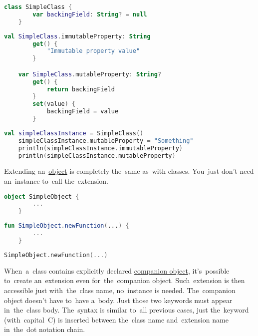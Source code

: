 \begin{lstlisting}[language=Kotlin, title={Class with a~backing field}]
    class SimpleClass {
        var backingField: String? = null
    }
\end{lstlisting}
\begin{lstlisting}[language=Kotlin, title={Extensions definition}]
    val SimpleClass.immutableProperty: String
        get() {
            "Immutable property value"
        }

    var SimpleClass.mutableProperty: String?
        get() {
            return backingField
        }
        set(value) {
            backingField = value
        }
\end{lstlisting}
\begin{lstlisting}[language=Kotlin, title={Usage}]
    val simpleClassInstance = SimpleClass()
    simpleClassInstance.mutableProperty = "Something"
    println(simpleClassInstance.immutableProperty)
    println(simpleClassInstance.mutableProperty)
\end{lstlisting}
\newpage

Extending an~\hyperref[kotlinobject]{object} is completely the~same as~with classes.
You~just don't need an~instance to~call the~extension.

\begin{lstlisting}[language=Kotlin, title={Object to be extended}]
    object SimpleObject {
        ...
    }
\end{lstlisting}
\begin{lstlisting}[language=Kotlin, title={Object extension definition}]
    fun SimpleObject.newFunction(...) {
        ...
    }
\end{lstlisting}
\begin{lstlisting}[language=Kotlin, title={Usage}]
    SimpleObject.newFunction(...)
\end{lstlisting}

When~a~class contains explicitly declared \hyperref[kotlincompanionobject]{companion object}, it's~possible to~create an~extension even for~the~companion object.
Such~extension is then accessible just with~the~class name, no~instance is needed.
The~companion object doesn't have to~have a~body.
Just those two keywords  must appear in~the~class body.
The~syntax is similar to~all previous cases, just the~keyword  (with~capital~C) is inserted between the~class name and~extension name in~the~dot notation chain.

